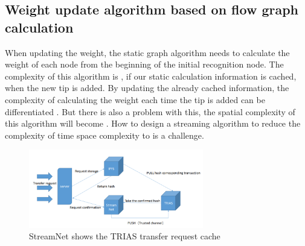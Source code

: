
\subsection{Weight update algorithm based on flow graph calculation}
When updating the weight, the static graph algorithm needs to calculate the weight of each node from the beginning of the initial recognition node. The complexity of this algorithm is , if our static calculation information is cached, when the new tip is added. By updating the already cached information, the complexity of calculating the weight each time the tip is added can be differentiated . But there is also a problem with this, the spatial complexity of this algorithm will become . How to design a streaming algorithm to reduce the complexity of time space complexity to  is a challenge.

\begin{figure}[H]
	\centering
	\includegraphics[width=3.0in]{figures/screenshot020.png}
	\caption{StreamNet shows the TRIAS transfer request cache}
	\label{simulationfigure}
\end{figure}

